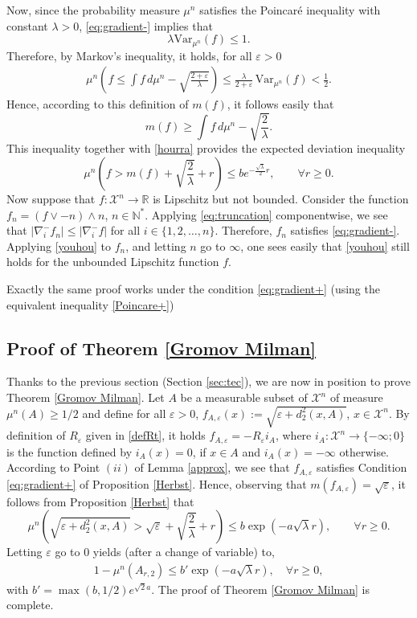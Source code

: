 \documentclass[11pt]{amsart}
\numberwithin{equation}{section}
\begin{document}
Now, since the probability measure  $\mu^n$  satisfies the Poincar\'e inequality with constant $\lambda>0$,    
\eqref{eq:gradient-} implies that 
\[\lambda\mathrm{Var}_{\mu^n}( f)\leq 1.\]
Therefore, by Markov's inequality, it holds, for all $\varepsilon>0$
 \begin{eqnarray*}
\mu^n\left( f\leq \int  f\,d\mu^n  -\sqrt{\frac { 2+\varepsilon} {\lambda}} \right) 
\leq \frac{\lambda}{2+\varepsilon} \,\mathrm{Var}_{\mu^n}( f) < \frac12.
\end{eqnarray*}
Hence, according to this definition of $m(f)$, it follows easily  that 
\[
m\left(  f\right)   \geq \int  f\,d\mu^n  -\sqrt{\frac { 2} {\lambda} }  .
\]
This inequality together with \eqref{hourra} provides the expected deviation inequality 
\begin{equation}\label{youhou}
\mu^n\left(f>m\left(  f\right) + \sqrt{\frac { 2} {\lambda} } +r\right)\leq be^{-\frac{\sqrt{\lambda}}{2}r},\qquad \forall r\geq0.
\end{equation}
Now suppose that $f:{\mathcal{X}}^n\to {\mathbb{R}}$ is Lipschitz but not bounded. Consider the function $f_n=(f\vee -n) \wedge n$, $n\in {\mathbb{N}}^*.$ 
Applying \eqref{eq:truncation} componentwise, we see that $|\nabla_i^-f_n|\leq |\nabla_i^-f|$ for all $i\in\{1,2,\ldots,n\}$. Therefore, $f_n$ satisfies \eqref{eq:gradient-}. Applying \eqref{youhou} to $f_n$, and letting $n$ go to $\infty$, one sees easily
that \eqref{youhou} still holds for the unbounded Lipschitz function $f$. 

Exactly the same proof works under the condition \eqref{eq:gradient+} (using the equivalent inequality \eqref{Poincare+})
\endproof

\subsection{Proof of Theorem \ref{Gromov Milman}}
Thanks to the previous section (Section \ref{sec:tec}), we are now in position to prove Theorem \ref{Gromov Milman}.
Let $A$ be a measurable subset of ${\mathcal{X}}^n$ of measure $\mu^n(A)\geq 1/2$ and define for all $\varepsilon>0$,
$f_{A,\varepsilon}(x):=\sqrt{\varepsilon+d_2^2(x,A)}$, $x \in {\mathcal{X}}^n$. By definition of $R_\varepsilon$ given in \eqref{defRt}, it holds $f_{A,\varepsilon}=-R_\varepsilon i_A$, where $i_A:{\mathcal{X}}^n\to \{-\infty; 0\}$ is the function defined by $i_A(x)=0$, if $x\in A$ and $i_A(x)=-\infty$ otherwise. 
According to Point $(ii)$ of Lemma \ref{approx}, we see that $f_{A,\varepsilon}$ satisfies Condition \eqref{eq:gradient+} of Proposition \ref{Herbst}. Hence, observing that $m(f_{A,\varepsilon})=\sqrt{\varepsilon}$, it follows from Proposition \ref{Herbst} that
\[
\mu^n\left(\sqrt{\varepsilon+d_2^2(x,A)}>\sqrt{\varepsilon} + \sqrt{\frac { 2} {\lambda} } +r\right)\leq b\exp\left(-a\sqrt{\lambda}r\right),\qquad \forall r\geq0 .
\]
Letting $\varepsilon$ go to $0$ yields (after a change of variable) to,
 \begin{eqnarray*}
1-\mu^n(A_{r,2}) \leq b' \exp(-a\sqrt{\lambda} r),\quad \forall r\geq 0,
\end{eqnarray*}
with $b'=\max(b,1/2)e^{\sqrt 2 a}$. The proof of Theorem \ref{Gromov Milman} is complete.
\endproof
\end{document}
